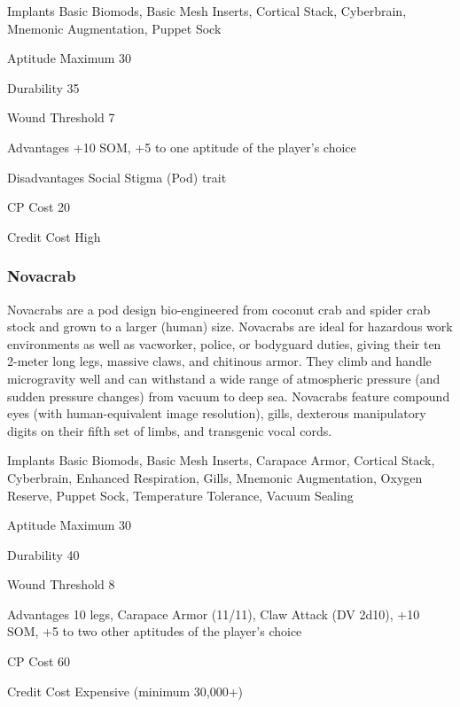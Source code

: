 \begin{description*}
\item[Implants] Basic Biomods, Basic Mesh Inserts, Cortical Stack, Cyberbrain,
  Mnemonic Augmentation, Puppet Sock
\item[Aptitude Maximum] 30 
\item[Durability] 35 
\item[Wound Threshold] 7 
\item[Advantages] +10 SOM, +5 to one aptitude of the player’s choice 
\item[Disadvantages] Social Stigma (Pod) trait 
\item[CP Cost] 20 
\item[Credit Cost] High 
\end{description*}

\subsubsection{Novacrab}
Novacrabs are a pod design bio-engineered from coconut crab and spider crab
stock and grown to a larger (human) size. Novacrabs are ideal for hazardous
work environments as well as vacworker, police, or bodyguard duties, giving
their ten 2-meter long legs, massive claws, and chitinous armor. They climb and
handle microgravity well and can withstand a wide range of atmospheric pressure
(and sudden pressure changes) from vacuum to deep sea. Novacrabs feature
compound eyes (with human-equivalent image resolution), gills, dexterous
manipulatory digits on their fifth set of limbs, and transgenic vocal cords.

\begin{description*}
\item[Implants] Basic Biomods, Basic Mesh Inserts, Carapace Armor, Cortical
  Stack, Cyberbrain, Enhanced Respiration, Gills, Mnemonic Augmentation, Oxygen
  Reserve, Puppet Sock, Temperature Tolerance, Vacuum Sealing
\item[Aptitude Maximum] 30 
\item[Durability] 40 
\item[Wound Threshold] 8 
\item[Advantages] 10 legs, Carapace Armor (11/11), Claw Attack (DV 2d10), +10
  SOM, +5 to two other aptitudes of the player’s choice
\item[CP Cost] 60 
\item[Credit Cost] Expensive (minimum 30,000+) 
\end{description*}

